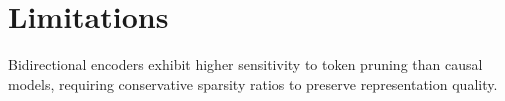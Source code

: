 \section{Limitations}Bidirectional encoders exhibit higher sensitivity to token pruning than causal models, requiring conservative sparsity ratios to preserve representation quality.
